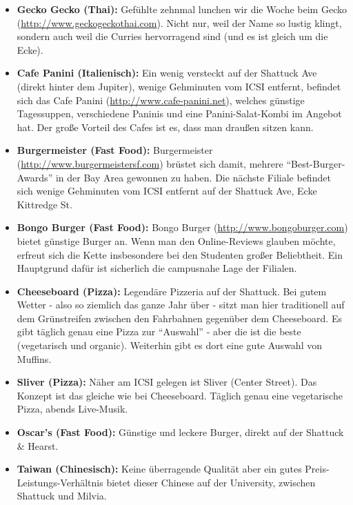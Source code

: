 \documentclass[a4paper]{scrreprt}
\begin{document}
\begin{itemize}
  \item \textbf{Gecko Gecko (Thai):} Gefühlte zehnmal lunchen wir die Woche beim Gecko (\url{http://www.geckogeckothai.com}). Nicht nur, weil der Name so lustig klingt, sondern auch weil die Curries hervorragend sind (und es ist gleich um die Ecke).

	\item \textbf{Cafe Panini (Italienisch):} Ein wenig versteckt auf der Shattuck Ave (direkt hinter dem Jupiter), wenige Gehminuten vom ICSI entfernt, befindet sich das Cafe Panini (\url{http://www.cafe-panini.net}), welches günstige Tagessuppen, verschiedene Paninis und eine Panini-Salat-Kombi im Angebot hat. Der große Vorteil des Cafes ist es, dass man draußen sitzen kann.

  \item \textbf{Burgermeister (Fast Food):} Burgermeister (\url{http://www.burgermeistersf.com}) brüstet sich damit, mehrere	 "`Best-Burger-Awards"' in der Bay Area gewonnen zu haben. Die nächste Filiale befindet sich wenige Gehminuten vom ICSI entfernt auf der Shattuck Ave, Ecke Kittredge St.

  \item \textbf{Bongo Burger (Fast Food):} Bongo Burger (\url{http://www.bongoburger.com}) bietet günstige Burger an. Wenn man den Online-Reviews glauben möchte, erfreut sich die Kette insbesondere bei den Studenten großer Beliebtheit. Ein Hauptgrund dafür ist sicherlich die campusnahe Lage der Filialen.

	\item \textbf{Cheeseboard (Pizza):} Legendäre Pizzeria auf der Shattuck. Bei gutem Wetter - also so ziemlich das ganze Jahr über - sitzt man hier traditionell auf dem Grünstreifen zwischen den Fahrbahnen gegenüber dem Cheeseboard. Es gibt täglich genau eine Pizza zur "`Auswahl"' - aber die ist die beste (vegetarisch und organic). Weiterhin gibt es dort eine gute Auswahl von Muffins.

	\item \textbf{Sliver (Pizza):} Näher am ICSI gelegen ist Sliver (Center Street). Das Konzept ist das gleiche wie bei Cheeseboard. Täglich genau eine vegetarische Pizza, abends Live-Musik.

  \item \textbf{Oscar's (Fast Food):} Günstige und leckere Burger, direkt auf der Shattuck \& Hearst.

	\item \textbf{Taiwan (Chinesisch):} Keine überragende Qualität aber ein gutes Preis-Leistungs-Verhältnis bietet dieser Chinese auf der University, zwischen Shattuck und Milvia.


\end{itemize}
\end{document}
